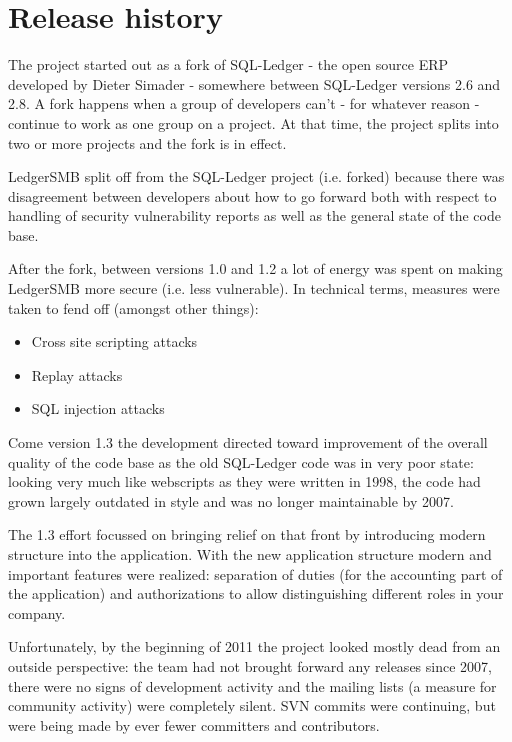 \section{Release history}

The project started out as a fork of SQL-Ledger - the open source ERP
developed by Dieter Simader - somewhere between SQL-Ledger versions 2.6
and 2.8.  A fork happens when a group of developers can't - for whatever
reason - continue to work as one group on a project.  At that time, the
project splits into two or more projects and the fork is in effect.

LedgerSMB split off from the SQL-Ledger project (i.e. forked) because
there was disagreement between developers about how to go forward both with
respect to handling of security vulnerability reports as well as the general
state of the code base.

After the fork, between versions 1.0 and 1.2 a lot of energy was spent on
making LedgerSMB more secure (i.e. less vulnerable).  In technical terms,
measures were taken to fend off (amongst other things):

\begin{itemize}
\item Cross site scripting attacks
\item Replay attacks
\item SQL injection attacks
\end{itemize}

Come version 1.3 the development directed toward improvement of the overall
quality of the code base as the old SQL-Ledger code was in very poor state:
looking very much like webscripts as they were written in 1998, the code had
grown largely outdated in style and was no longer maintainable by 2007.

The 1.3 effort focussed on bringing relief on that front by introducing
modern structure into the application.  With the new application structure
modern and important features were realized: separation of duties (for the
accounting part of the application) and authorizations to allow distinguishing
different roles in your company.

Unfortunately, by the beginning of 2011 the project looked mostly dead from
an outside perspective: the team had not brought forward any releases since
2007, there were no signs of development activity and the
mailing lists (a measure for community activity) were
completely silent.  SVN commits were continuing, but were being made by ever 
fewer committers and contributors.

